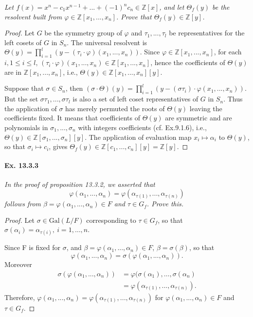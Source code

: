 \documentclass[11pt,a4paper]{article}
\newcommand{\Z}{\mathbb{Z}}
\newcommand{\Gal}{\mathrm{Gal}}
\begin{document}
{\it Let $f(x)=x^n-c_1x^{n-1}+...+(-1)^n c_n \in \Z[x]$, and let $\Theta_f(y)$ be the resolvent built from $\varphi \in \Z [x_1,...,x_n]$. Prove that $\Theta_f(y) \in \Z[y]$.

\begin{proof}
Let $G$ be the symmetry group of $\varphi$ and $\tau_1,...,\tau_l$ be representatives for the left cosets of $G$ in $S_n$. The universal resolvent is $\Theta(y)=\prod_{i=1}^l ( y - (\tau_i \cdot\varphi)(x_1,...,x_n))$. Since $\varphi \in \Z [x_1,...,x_n]$, for each $i, 1\leq i \leq l$, $(\tau_i\cdot\varphi)(x_1,...,x_n)\in \Z [x_1,...,x_n]  $, hence the coefficients of $\Theta(y)$ are in $\Z [x_1,...,x_n]  $, i.e., $\Theta(y)\in \Z [x_1,...,x_n][y]  $.

Suppose that $\sigma \in S_n$, then $(\sigma\cdot \Theta)(y)=\prod_{i=1}^l ( y - (\sigma\tau_i)\cdot \varphi(x_1,...,x_n))$. But the set $\sigma\tau_1,...,\sigma\tau_l$ is also a set of left coset representatives of $G$ in $S_n$. Thus the application of $\sigma$ has merely permuted the roots of $\Theta(y)$ leaving the coefficients fixed. It means that coefficients of $\Theta(y)$ are symmetric and are polynomials in $\sigma_1,...,\sigma_n$ with integers coefficients (cf. Ex.9.1.6), i.e., $\Theta(y)\in \Z [\sigma_1,...,\sigma_n][y]  $.
The application of evaluation map $x_i \mapsto \alpha_i$ to $\Theta(y)$,  so that $\sigma_i \mapsto c_i$, gives $\Theta_f(y) \in \Z [c_1,...,c_n][y] = \Z[y]$.
\end{proof}
}

\paragraph{Ex. 13.3.3}

{\it In the proof of proposition 13.3.2, we asserted that $$\varphi (\alpha_1,...,\alpha_n)=\varphi (\alpha_{\tau(1)},...,\alpha_{\tau(n)})$$ follows from $\beta=\varphi (\alpha_1,...,\alpha_n) \in F$ and $\tau \in G_f$. Prove this.

\begin{proof}
Let $\sigma \in \Gal(L/F)$ corresponding to $\tau \in G_f$, so that  $\sigma(\alpha_i) = \alpha_{\tau(i)}, \ i= 1,\ldots,n$. 

Since F is fixed for $\sigma$, and $\beta = \varphi (\alpha_1,...,\alpha_n)  \in F$, $\beta = \sigma(\beta)$, so that
$$\varphi (\alpha_1,...,\alpha_n) = \sigma(\varphi (\alpha_1,...,\alpha_n)).$$ 
Moreover
\begin{align*}
\sigma(\varphi (\alpha_1,...,\alpha_n))&= \varphi(\sigma(\alpha_1),\ldots,\sigma(\alpha_n)\\
&=\varphi (\alpha_{\tau(1)},...,\alpha_{\tau(n)}). 
\end{align*}
Therefore, $\varphi (\alpha_1,...,\alpha_n)=\varphi (\alpha_{\tau(1)},...,\alpha_{\tau(n)})$ for $\varphi (\alpha_1,...,\alpha_n) \in F$ and $\tau \in G_f$.
\end{proof}
}
\end{document}
